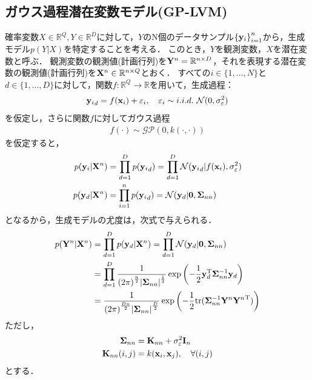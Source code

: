 \documentclass[11pt,a4j]{article}
\begin{document}
      \subsection{ガウス過程潜在変数モデル(GP-LVM)}
        確率変数$X \in \mathbb{R}^{Q}, Y \in \mathbb{R}^{D}$に対して，$Y$のN個のデータサンプル${ \{ {\bf y}_i \} }_{i=1}^{n}$から，生成モデル$p(Y|X)$を特定することを考える．
        このとき，$Y$を観測変数，$X$を潜在変数と呼ぶ．
        観測変数の観測値(計画行列)を${\bf Y}^n = \mathbb{R}^{n \times D}$，それを表現する潜在変数の観測値(計画行列)を${\bf X}^n \in \mathbb{R}^{n \times Q}$とおく．
        すべての$i \in \{1,\dots,N\}$と$d \in \{1,\dots,D\}$に対して，関数$f: \mathbb{R}^Q \to \mathbb{R}$を用いて，生成過程：
        \begin{align}
          {{\bf y}_i}_d = f({\bf x}_i) + \varepsilon_i, ~~~
          \varepsilon_i \sim i.i.d. ~ \mathcal{N}(0, \sigma_{\varepsilon}^2)
        \end{align}
        を仮定し，さらに関数$f$に対してガウス過程
        \begin{align}
          f(\cdot) \sim \mathcal{GP}(0, k(\cdot,\cdot))
        \end{align}
        を仮定すると，
        \begin{align}
          p({\bf y}_i | {\bf X}^n) &= \prod_{d=1}^{D} p({{\bf y}_i}_d) = \prod_{d=1}^{D} \mathcal{N}({{\bf y}_i}_d | f({\bf x}_i), \sigma_\varepsilon^2 ) \\
          p({\bf y}_d | {\bf X}^n) &= \prod_{i=1}^{n} p({{\bf y}_i}_d) = \mathcal{N}({\bf y}_d | {\bf 0}, {\bf \Sigma}_{nn})
        \end{align}
        となるから，生成モデルの尤度は，次式で与えられる．
        \begin{align}
          p({\bf Y}^n|{\bf X}^n) &= \prod_{d=1}^{D} p({\bf y}_d | {\bf X}^n) = \prod_{d=1}^{D} \mathcal{N}({\bf y}_d | {\bf 0}, {\bf \Sigma}_{nn}) \\
          &= \prod_{d=1}^{D} \frac{1}{{(2 \pi)}^{\frac{n}{2}} {|{\bf \Sigma}_{nn}|}^{\frac{1}{2}}} \exp \left( - \frac{1}{2} {\bf y}_d^{\mathrm{T}} {\bf \Sigma}_{nn}^{-1} {\bf y}_d \right) \\
          &= \frac{1}{{(2 \pi)}^{\frac{Dn}{2}} {|{\bf \Sigma}_{nn}|}^{\frac{D}{2}}} \exp \left( - \frac{1}{2} {\rm tr}({\bf \Sigma}_{nn}^{-1} {{\bf Y}^n}{{\bf Y}^n}^{\mathrm{T}}) \right)
        \end{align}
        ただし，
        \begin{align}
          {\bf \Sigma}_{nn} &= {\bf K}_{nn} + \sigma_{\varepsilon}^2 {\bf I}_n \\
          {\bf K}_{nn}(i,j) &= k({\bf x}_i, {\bf x}_j), ~~~ \forall (i,j)
        \end{align}
        とする．
\end{document}
